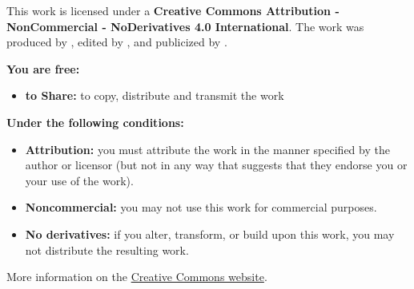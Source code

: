     This work is licensed under a \textbf{Creative Commons Attribution - NonCommercial - NoDerivatives 4.0 International}.
    The work was produced by \DDauthors\ifx\DDeditors\empty\else, edited by \DDeditors\fi{}, and publicized by \DDorganization.

    \textbf{You are free:}
    \begin{itemize}[topsep=0pt,itemsep=0pt,parsep=0pt,partopsep=0pt]
        \item \textbf{to Share:} to copy, distribute and transmit the work
    \end{itemize}

    \textbf{Under the following conditions:}
    \begin{itemize}[topsep=0pt,itemsep=0pt,parsep=0pt,partopsep=0pt]
        \item \textbf{Attribution:} you must attribute the work in the manner specified by the author or licensor (but not in any way that suggests that they endorse you or your use of the work).
        \item \textbf{Noncommercial:} you may not use this work for commercial purposes.
        \item \textbf{No derivatives:} if you alter, transform, or build upon this work, you may not distribute the resulting work.
    \end{itemize}

    More information on the \href{https://creativecommons.org/licenses/by-nc-nd/4.0/}{Creative Commons website}.
\fi

\clearpage
